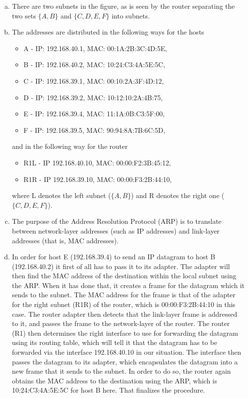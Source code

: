 \documentclass[10pt]{article}
\begin{document}
\begin{enumerate}[a)]
    \item There are two subnets in the figure, as is seen by the router separating the two sets $\{A,B\}$ and $\{C,D,E,F\}$ into subnets. 
    \item The addresses are distributed in the following ways for the hosts
        \begin{itemize}
            \item A - IP: 192.168.40.1, MAC: 00:1A:2B:3C:4D:5E,
            \item B - IP: 192.168.40.2, MAC: 10:24:C3:4A:5E:5C,
            \item C - IP: 192.168.39.1, MAC: 00:10:2A:3F:4D:12,
            \item D - IP: 192.168.39.2, MAC: 10:12:10:2A:4B:75,
            \item E - IP: 192.168.39.4, MAC: 11:1A:0B:C3:5F:00,
            \item F - IP: 192.168.39.5, MAC: 90:94:8A:7B:6C:5D,
        \end{itemize}
and in the following way for the router
        \begin{itemize}
            \item R1L - IP 192.168.40.10, MAC: 00:00:F2:3B:45:12,
            \item R1R - IP 192.168.39.10, MAC: 00:00:F3:2B:44:10,
        \end{itemize}
where L denotes the left subnet ($\{A,B\}$) and R denotes the right one ($\{C,D,E,F\}$).
    \item The purpose of the Address Resolution Protocol (ARP) is to translate between network-layer addresses (such as IP addresses) and link-layer addresses (that is, MAC addresses).
    \item In order for host E (192.168.39.4) to send an IP datagram to host B (192.168.40.2) it first of all has to pass it to its adapter. The adapter will then find the MAC address of the destination within the local subnet using the ARP. When it has done that, it creates a frame for the datagram which it sends to the subnet. The MAC address for the frame is that of the adapter for the right subnet (R1R) of the router, which is 00:00:F3:2B:44:10 in this case. The router adapter then detects that the link-layer frame is addressed to it, and passes the frame to the network-layer of the router. The router (R1) then determines the right interface to use for forwarding the datagram using its routing table, which will tell it that the datagram has to be forwarded via the interface 192.168.40.10 in our situation. The interface then passes the datagram to its adapter, which encapsulates the datagram into a new frame that it sends to the subnet. In order to do so, the router again obtains the MAC address to the destination using the ARP, which is 10:24:C3:4A:5E:5C for host B here. That finalizes the procedure.

\end{enumerate}
\end{document}
